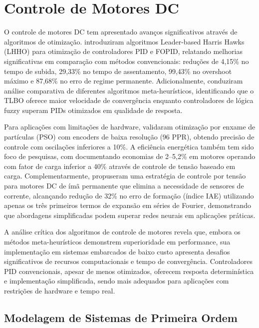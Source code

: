\section{Controle de Motores DC}
\label{sec:controle-motores-dc}

O controle de motores DC tem apresentado avanços significativos através de algoritmos de otimização.  introduziram algoritmos Leader-based Harris Hawks (LHHO) para otimização de controladores PID e FOPID, relatando melhorias significativas em comparação com métodos convencionais: reduções de 4,15\% no tempo de subida, 29,33\% no tempo de assentamento, 99,43\% no overshoot máximo e 87,68\% no erro de regime permanente. Adicionalmente,  conduziram análise comparativa de diferentes algoritmos meta-heurísticos, identificando que o TLBO oferece maior velocidade de convergência enquanto controladores de lógica fuzzy superam PIDs otimizados em qualidade de resposta.

Para aplicações com limitações de hardware,  validaram otimização por enxame de partículas (PSO) com encoders de baixa resolução (96 PPR), obtendo precisão de controle com oscilações inferiores a 10\%. A eficiência energética também tem sido foco de pesquisas, com  documentando economias de 2--5,2\% em motores operando com fator de carga inferior a 40\% através de controle de tensão baseado em carga. Complementarmente,  propuseram uma estratégia de controle por tensão para motores DC de ímã permanente que elimina a necessidade de sensores de corrente, alcançando redução de 32\% no erro de formação (índice IAE) utilizando apenas os três primeiros termos de expansão em séries de Fourier, demonstrando que abordagens simplificadas podem superar redes neurais em aplicações práticas.

A análise crítica dos algoritmos de controle de motores revela que, embora os métodos meta-heurísticos demonstrem superioridade em performance, sua implementação em sistemas embarcados de baixo custo apresenta desafios significativos de recursos computacionais e tempo de convergência. Controladores PID convencionais, apesar de menos otimizados, oferecem resposta determinística e implementação simplificada, sendo mais adequados para aplicações com restrições de hardware e tempo real.

\subsection{Modelagem de Sistemas de Primeira Ordem}
\label{subsec:sistemas-primeira-ordem}

